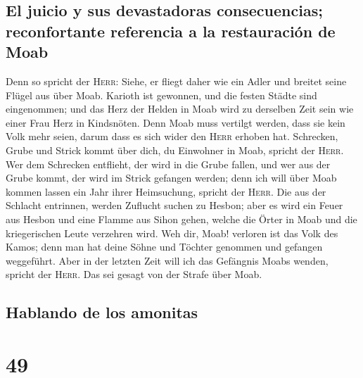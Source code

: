 \hypertarget{el-juicio-y-sus-devastadoras-consecuencias-reconfortante-referencia-a-la-restauraciuxf3n-de-moab}{%
\subsection{El juicio y sus devastadoras consecuencias; reconfortante
referencia a la restauración de
Moab}\label{el-juicio-y-sus-devastadoras-consecuencias-reconfortante-referencia-a-la-restauraciuxf3n-de-moab}}

 Denn so spricht der \textsc{Herr}: Siehe, er fliegt
daher wie ein Adler und breitet seine Flügel aus über Moab.
 Karioth ist gewonnen, und die festen Städte sind
eingenommen; und das Herz der Helden in Moab wird zu derselben Zeit sein
wie einer Frau Herz in Kindsnöten.  Denn Moab muss
vertilgt werden, dass sie kein Volk mehr seien, darum dass es sich wider
den \textsc{Herr} erhoben hat.  Schrecken, Grube und
Strick kommt über dich, du Einwohner in Moab, spricht der \textsc{Herr}.
 Wer dem Schrecken entflieht, der wird in die Grube
fallen, und wer aus der Grube kommt, der wird im Strick gefangen werden;
denn ich will über Moab kommen lassen ein Jahr ihrer Heimsuchung,
spricht der \textsc{Herr}.  Die aus der Schlacht
entrinnen, werden Zuflucht suchen zu Hesbon; aber es wird ein Feuer aus
Hesbon und eine Flamme aus Sihon gehen, welche die Örter in Moab und die
kriegerischen Leute verzehren wird.  Weh dir, Moab!
verloren ist das Volk des Kamos; denn man hat deine Söhne und Töchter
genommen und gefangen weggeführt.  Aber in der letzten
Zeit will ich das Gefängnis Moabs wenden, spricht der \textsc{Herr}. Das
sei gesagt von der Strafe über Moab.

\hypertarget{hablando-de-los-amonitas}{%
\subsection{Hablando de los amonitas}\label{hablando-de-los-amonitas}}

\hypertarget{section-48}{%
\section{49}\label{section-48}}

